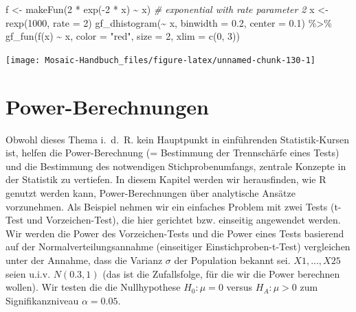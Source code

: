 \documentclass[
  ngerman,
]{scrbook}
\newenvironment{Shaded}{\begin{snugshade}}{\end{snugshade}}
\newcommand{\AttributeTok}[1]{\textcolor[rgb]{0.77,0.63,0.00}{#1}}
\newcommand{\CommentTok}[1]{\textcolor[rgb]{0.56,0.35,0.01}{\textit{#1}}}
\newcommand{\DecValTok}[1]{\textcolor[rgb]{0.00,0.00,0.81}{#1}}
\newcommand{\FloatTok}[1]{\textcolor[rgb]{0.00,0.00,0.81}{#1}}
\newcommand{\FunctionTok}[1]{\textcolor[rgb]{0.00,0.00,0.00}{#1}}
\newcommand{\NormalTok}[1]{#1}
\newcommand{\OtherTok}[1]{\textcolor[rgb]{0.56,0.35,0.01}{#1}}
\newcommand{\SpecialCharTok}[1]{\textcolor[rgb]{0.00,0.00,0.00}{#1}}
\newcommand{\StringTok}[1]{\textcolor[rgb]{0.31,0.60,0.02}{#1}}
\begin{document}
\begin{Shaded}
\begin{Highlighting}[]
\NormalTok{f }\OtherTok{\textless{}{-}} \FunctionTok{makeFun}\NormalTok{(}\DecValTok{2} \SpecialCharTok{*} \FunctionTok{exp}\NormalTok{(}\SpecialCharTok{{-}}\DecValTok{2} \SpecialCharTok{*}\NormalTok{ x) }\SpecialCharTok{\textasciitilde{}}\NormalTok{ x) }\CommentTok{\# exponential with rate parameter 2}
\NormalTok{x }\OtherTok{\textless{}{-}} \FunctionTok{rexp}\NormalTok{(}\DecValTok{1000}\NormalTok{, }\AttributeTok{rate =} \DecValTok{2}\NormalTok{)}
\FunctionTok{gf\_dhistogram}\NormalTok{(}\SpecialCharTok{\textasciitilde{}}\NormalTok{ x, }\AttributeTok{binwidth =} \FloatTok{0.2}\NormalTok{, }\AttributeTok{center =} \FloatTok{0.1}\NormalTok{) }\SpecialCharTok{\%\textgreater{}\%}
  \FunctionTok{gf\_fun}\NormalTok{(}\FunctionTok{f}\NormalTok{(x) }\SpecialCharTok{\textasciitilde{}}\NormalTok{ x, }\AttributeTok{color =} \StringTok{"red"}\NormalTok{, }\AttributeTok{size =} \DecValTok{2}\NormalTok{, }\AttributeTok{xlim =} \FunctionTok{c}\NormalTok{(}\DecValTok{0}\NormalTok{, }\DecValTok{3}\NormalTok{))}
\end{Highlighting}
\end{Shaded}

\begin{center}\texttt{[image: Mosaic-Handbuch\_files/figure-latex/unnamed-chunk-130-1]} \end{center}

\hypertarget{powerberechnung}{%
\chapter{Power-Berechnungen}\label{powerberechnung}}

Obwohl dieses Thema i.~d.~R. kein Hauptpunkt in einführenden Statistik-Kursen ist, helfen die Power-Berechnung (= Bestimmung der Trennschärfe eines Tests) und die Bestimmung des notwendigen Stichprobenumfangs, zentrale Konzepte in der Statistik zu vertiefen. In diesem Kapitel werden wir herausfinden, wie \textsf{R} genutzt werden kann, Power-Berechnungen über analytische Ansätze vorzunehmen. Als Beispiel nehmen wir ein einfaches Problem mit zwei Tests (t-Test und Vorzeichen-Test), die hier gerichtet bzw. einseitig angewendet werden.
Wir werden die Power des Vorzeichen-Tests und die Power eines Tests basierend auf der Normalverteilungsannahme (einseitiger Einstichproben-t-Test) vergleichen unter der Annahme, dass die Varianz \(\sigma\) der Population bekannt sei. \(X1, ... , X25\) seien u.i.v. \(N(0.3, 1)\) (das ist die Zufallsfolge, für die wir die Power berechnen wollen). Wir testen die die Nullhypothese \(H_0: \mu = 0\) versus \(H_A: \mu > 0\) zum Signifikanzniveau \(\alpha = 0.05\).
\end{document}
